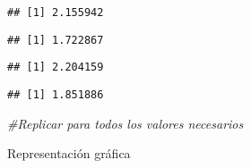\documentclass[
]{article}
\newenvironment{Shaded}{\begin{snugshade}}{\end{snugshade}}
\newcommand{\CommentTok}[1]{\textcolor[rgb]{0.56,0.35,0.01}{\textit{#1}}}
\newcommand{\FloatTok}[1]{\textcolor[rgb]{0.00,0.00,0.81}{#1}}
\newcommand{\KeywordTok}[1]{\textcolor[rgb]{0.13,0.29,0.53}{\textbf{#1}}}
\newcommand{\NormalTok}[1]{#1}
\newcommand{\OperatorTok}[1]{\textcolor[rgb]{0.81,0.36,0.00}{\textbf{#1}}}
\newcommand{\StringTok}[1]{\textcolor[rgb]{0.31,0.60,0.02}{#1}}
\begin{document}
\begin{verbatim}
## [1] 2.155942
\end{verbatim}

\begin{Shaded}
\end{Shaded}

\begin{verbatim}
## [1] 1.722867
\end{verbatim}

\begin{Shaded}
\end{Shaded}

\begin{verbatim}
## [1] 2.204159
\end{verbatim}

\begin{Shaded}
\end{Shaded}

\begin{verbatim}
## [1] 1.851886
\end{verbatim}

\begin{Shaded}
\begin{Highlighting}[]
\CommentTok{#Replicar para todos los valores necesarios}
\end{Highlighting}
\end{Shaded}

Representación gráfica
\end{document}
